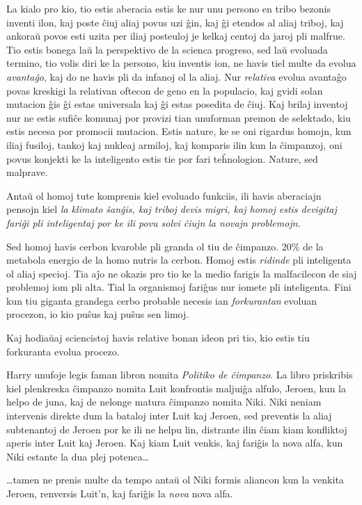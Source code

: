 La kialo pro kio, tio estis aberacia estis ke nur unu persono en tribo
bezonis inventi ilon, kaj poste ĉiuj aliaj povus uzi ĝin, kaj ĝi
etendos al aliaj triboj, kaj ankoraŭ povos esti uzita per iliaj
posteuloj je kelkaj centoj da jaroj pli malfrue. Tio estis bonega laŭ
la perspektivo de la scienca progreso, sed laŭ evoluada termino, tio
volis diri ke la persono, kiu inventis ion, ne havis tiel multe da
evolua \emph{avantaĝo}, kaj do ne havis pli da infanoj ol la
aliaj. Nur \emph{relativa} evolua avantaĝo povas kreskigi la relativan
oftecon de geno en la populacio, kaj gvidi solan mutacion ĝis ĝi estas
universala kaj ĝi estas posedita de ĉiuj. Kaj brilaj inventoj nur ne
estis sufiĉe komunaj por provizi tian unuforman premon de selektado,
kiu estis necesa por promocii mutacion. Estis nature, ke se oni
rigardus homojn, kun iliaj fusiloj, tankoj kaj nukleaj armiloj, kaj
komparis ilin kun la ĉimpanzoj, oni povus konjekti ke la inteligento
estis tie por fari teĥnologion. Nature, sed malprave.

Antaŭ ol homoj tute komprenis kiel evoluado funkciis, ili havis
aberaciajn pensojn kiel \emph{la klimato ŝanĝis, kaj triboj devis
  migri, kaj homoj estis devigitaj fariĝi pli inteligentaj por ke ili
  povu solvi ĉiujn la novajn problemojn.}

Sed homoj havis cerbon kvaroble pli granda ol tiu de ĉimpanzo. 20\% de
la metabola energio de la homo nutris la cerbon. Homoj estis
\emph{ridinde} pli inteligenta ol aliaj specioj. Tia aĵo ne okazis pro
tio ke la medio farigis la malfacilecon de siaj problemoj iom pli
alta. Tial la organismoj fariĝus nur iomete pli inteligenta. Fini kun
tiu giganta grandega cerbo probable necesis ian \emph{forkurantan}
evoluan procezon, io kio puŝus kaj puŝus sen limoj.

Kaj hodiaŭaj sciencistoj havis relative bonan ideon pri tio, kio estis
tiu forkuranta evolua procezo.

Harry unufoje legis faman libron nomita \emph{Politiko de
  ĉimpanzo}. La libro priskribis kiel plenkreska ĉimpanzo nomita Luit
konfrontis maljuiĝa alfulo, Jeroen, kun la helpo de juna, kaj de
nelonge matura ĉimpanzo nomita Niki. Niki neniam intervenis direkte
dum la bataloj inter Luit kaj Jeroen, sed preventis la aliaj
subtenantoj de Jeroen por ke ili ne helpu lin, distrante ilin ĉiam
kiam konfliktoj aperis inter Luit kaj Jeroen. Kaj kiam Luit venkis,
kaj fariĝis la nova alfa, kun Niki estante la dua plej potenca\ldots{}

\ldots{}tamen ne prenis multe da tempo antaŭ ol Niki formis aliancon
kun la venkita Jeroen, renversis Luit'n, kaj fariĝis la \emph{nova}
nova alfa.

